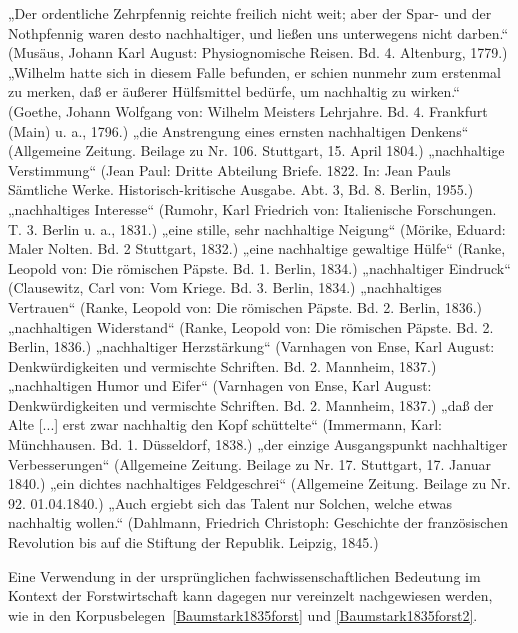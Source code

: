 \documentclass[
    german,
    a4paper,%
    12pt,%
    oneside,%
    toc=bibliography,
    final,
]{scrartcl}
\begin{document}
\begin{exe}
\ex \label{ex-1776-1845-allg-1} „Der ordentliche Zehrpfennig reichte freilich nicht weit; aber der Spar- und der Nothpfennig waren desto nachhaltiger, und ließen uns unterwegens nicht darben.“ (Musäus, Johann Karl August: Physiognomische Reisen. Bd. 4. Altenburg, 1779.)
\ex „Wilhelm hatte sich in diesem Falle befunden, er schien nunmehr zum erstenmal zu merken, daß er äußerer Hülfsmittel bedürfe, um nachhaltig zu wirken.“ (Goethe, Johann Wolfgang von: Wilhelm Meisters Lehrjahre. Bd. 4. Frankfurt (Main) u. a., 1796.)
\ex „die Anstrengung eines ernsten nachhaltigen Denkens“ (Allgemeine Zeitung. Beilage zu Nr. 106. Stuttgart, 15. April 1804.)
\ex „nachhaltige Verstimmung“ (Jean Paul: Dritte Abteilung Briefe. 1822. In: Jean Pauls Sämtliche Werke. Historisch-kritische Ausgabe. Abt. 3, Bd. 8. Berlin, 1955.)
\ex „nachhaltiges Interesse“ (Rumohr, Karl Friedrich von: Italienische Forschungen. T. 3. Berlin u. a., 1831.)
\ex „eine stille, sehr nachhaltige Neigung“ (Mörike, Eduard: Maler Nolten. Bd. 2 Stuttgart, 1832.)
\ex „eine nachhaltige gewaltige Hülfe“ (Ranke, Leopold von: Die römischen Päpste. Bd. 1. Berlin, 1834.)
\ex „nachhaltiger Eindruck“ (Clausewitz, Carl von: Vom Kriege. Bd. 3. Berlin, 1834.)
\ex „nachhaltiges Vertrauen“ (Ranke, Leopold von: Die römischen Päpste. Bd. 2. Berlin, 1836.)
\ex „nachhaltigen Widerstand“ (Ranke, Leopold von: Die römischen Päpste. Bd. 2. Berlin, 1836.)
\ex „nachhaltiger Herzstärkung“ (Varnhagen von Ense, Karl August: Denkwürdigkeiten und vermischte Schriften. Bd. 2. Mannheim, 1837.)
\ex „nachhaltigen Humor und Eifer“ (Varnhagen von Ense, Karl August: Denkwürdigkeiten und vermischte Schriften. Bd. 2. Mannheim, 1837.)
\ex „daß der Alte [...] erst zwar nachhaltig den Kopf schüttelte“ (Immermann, Karl: Münchhausen. Bd. 1. Düsseldorf, 1838.)
\ex „der einzige Ausgangspunkt nachhaltiger Verbesserungen“ (Allgemeine Zeitung. Beilage zu Nr. 17. Stuttgart, 17. Januar 1840.)
\ex „ein dichtes nachhaltiges Feldgeschrei“ (Allgemeine Zeitung. Beilage zu Nr. 92. 01.04.1840.)
\ex \label{ex-1776-1845-allg-n} „Auch ergiebt sich das Talent nur Solchen, welche etwas nachhaltig wollen.“ (Dahlmann, Friedrich Christoph: Geschichte der französischen Revolution bis auf die Stiftung der Republik. Leipzig, 1845.)
\end{exe}

Eine Verwendung in der ursprünglichen fachwissenschaftlichen Bedeutung im Kontext der Forstwirtschaft kann dagegen nur vereinzelt nachgewiesen werden, wie in den Korpusbelegen~\ref{Baumstark1835forst} und \ref{Baumstark1835forst2}.
\end{document}
